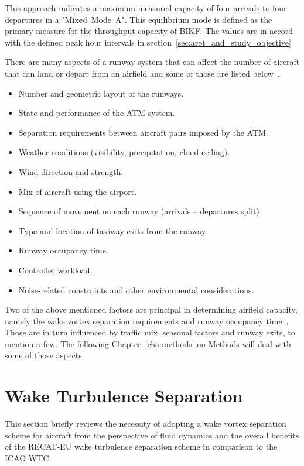 This approach indicates a maximum measured capacity of four arrivals to four departures in a "Mixed~Mode~A". This equilibrium mode is defined as the primary measure for the throughput capacity of BIKF. The values are in accord with the defined peak hour intervals in section~\ref{sec:arot_and_study_objective}

There are many aspects of a runway system that can affect the number of aircraft that can land or depart from an airfield and some of those are listed below~\cite{de_neufville_airport_2013, kim_validation_2010}.
\begin{itemize}
    \item Number and geometric layout of the runways.
    \item State and performance of the ATM system.
    \item Separation requirements between aircraft pairs imposed by the ATM.
    \item Weather conditions (visibility, precipitation, cloud ceiling). 
    \item Wind direction and strength.
    \item Mix of aircraft using the airport.
    \item Sequence of movement on each runway (arrivals -- departures split)
    \item Type and location of taxiway exits from the runway.
    \item Runway occupancy time.
    \item Controller workload.
    \item Noise-related constraints and other environmental considerations.
\end{itemize}

Two of the above mentioned factors are principal in determining airfield capacity, namely the wake vortex separation requirements and runway occupancy time~\cite{kolos2013influence}. Those are in turn influenced by traffic mix, seasonal factors and runway exits, to mention a few. The following Chapter~\ref{cha:methods} on Methods will deal with some of those aspects. 


\section{Wake Turbulence Separation}
This section briefly reviews the necessity of adopting a wake vortex separation scheme for aircraft from the perspective of fluid dynamics and the overall benefits of the RECAT-EU wake turbulence separation scheme in comparison to the ICAO WTC.

